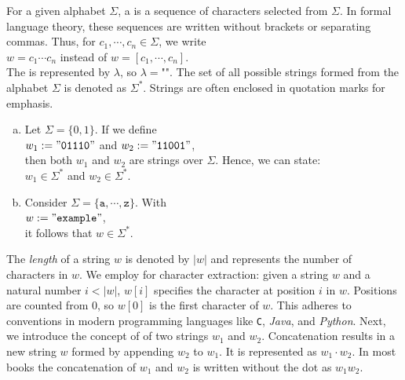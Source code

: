 \begin{Definition}[Strings]
For a given alphabet \( \Sigma \), a   is a sequence of characters selected from \( \Sigma \). In formal language theory, these sequences are written without brackets or separating commas. Thus, for \( c_1, \cdots, c_n \in \Sigma \), we write
\\[0.2cm]
\hspace*{1.3cm}
\( w = c_1 \cdots c_n \) \quad instead of \quad \( w = [c_1, \cdots, c_n] \).
\\[0.2cm]
The  is represented by \( \lambda \), \index{\( \lambda \)} so \( \lambda = \texttt{""} \).
The set of all possible strings formed from the alphabet \( \Sigma \) is denoted as \( \Sigma^* \). \index{\( \Sigma^* \)} Strings are often enclosed in quotation marks for emphasis.
\eox
\end{Definition}

\examplesEng
\begin{enumerate}[(a)]
\item Let \( \Sigma = \{0, 1\} \).  If we define
\\[0.2cm]
\hspace*{1.3cm}
\( w_1 := \mathtt{"01110"} \) and \( w_2 := \mathtt{"11001"} \),
\\[0.2cm]
then both \( w_1 \) and \( w_2 \) are strings over \( \Sigma \). Hence, we can state:
\\[0.2cm]
\hspace*{1.3cm}
\( w_1 \in \Sigma^* \) and \( w_2 \in \Sigma^* \).
\item Consider \( \Sigma = \{\mathtt{a}, \cdots, \mathtt{z}\} \). With
\\[0.2cm]
\hspace*{1.3cm}
\( w := \mathtt{"example"} \),
\\[0.2cm]
it follows that \( w \in \Sigma^* \). \eox
\end{enumerate}
The \emph{length} of a string \( w \) is denoted by \( |w| \) and represents the number of characters in \( w
\).
We employ  for character extraction: given a string \( w \) and a natural number
\( i < |w| \), \( w[i] \) specifies the character at position \( i \) in \( w \). Positions are counted from 0,
so \( w[0] \) is the first character of \( w \).  This adheres to
conventions in modern programming languages like \texttt{C}, \textsl{Java}, and \textsl{Python}.
Next, we introduce the concept of   of two strings \( w_1 \) and
\(w_2 \). Concatenation results in a new string \( w \) formed by appending \( w_2 \) to \( w_1 \). It is
represented as \( w_1 \cdot w_2 \).  In most books the concatenation of $w_1$ and $w_2$ is written without the
dot as \( w_1w_2 \).

